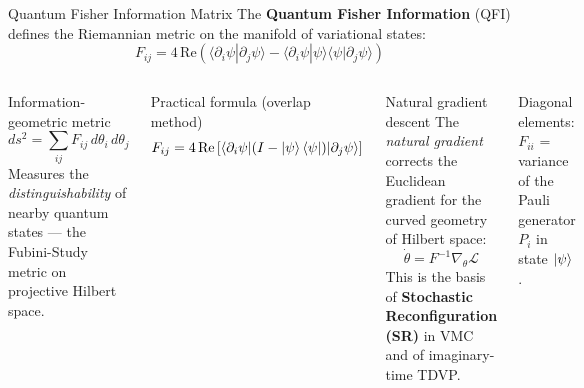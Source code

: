 \documentclass[aspectratio=169,10pt]{beamer}
\begin{document}
\begin{frame}{Quantum Fisher Information Matrix}
  The \textbf{Quantum Fisher Information} (QFI) defines the Riemannian
  metric on the manifold of variational states:
  \[
    F_{ij} = 4\,\mathrm{Re}\!\left(
      \langle\partial_i\psi|\partial_j\psi\rangle
      - \langle\partial_i\psi|\psi\rangle
        \langle\psi|\partial_j\psi\rangle
    \right)
  \]

  \begin{columns}[T]
      \begin{block}{Information-geometric metric}
        \[
          ds^2 = \sum_{ij} F_{ij}\,d\theta_i\,d\theta_j
        \]
        Measures the \emph{distinguishability} of nearby quantum
        states — the Fubini-Study metric on projective Hilbert space.
      \end{block}
      \vspace{0.2cm}
      \begin{block}{Practical formula (overlap method)}
        \[
          F_{ij} = 4\,\mathrm{Re}\left[
            \bra{\partial_i\psi}\!\left(I - \ket{\psi}\bra{\psi}\right)
            \!\ket{\partial_j\psi}
          \right]
        \]
      \end{block}
      \begin{alertblock}{Natural gradient descent}
        The \emph{natural gradient} corrects the Euclidean gradient
        for the curved geometry of Hilbert space:
        \[
          \dot{\theta} = F^{-1}\nabla_\theta\mathcal{L}
        \]
        This is the basis of \textbf{Stochastic Reconfiguration (SR)}
        in VMC and of imaginary-time TDVP.
      \end{alertblock}
      \vspace{0.2cm}
      Diagonal elements: $F_{ii}$ = variance of the Pauli generator
      $P_i$ in state $\ket{\psi}$.
  \end{columns}
\end{frame}
\end{document}
